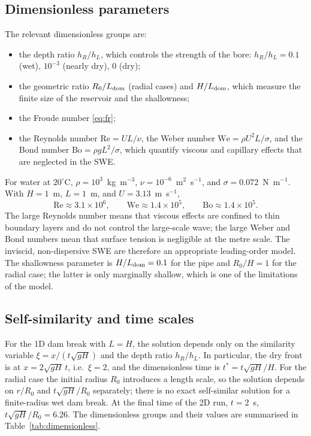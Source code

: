 ﻿\documentclass[11pt,a4paper]{article}
\newcommand{\Rey}{\mathrm{Re}}
\newcommand{\We}{\mathrm{We}}
\newcommand{\Bo}{\mathrm{Bo}}
\begin{document}
\subsection{Dimensionless parameters}
The relevant dimensionless groups are:
\begin{itemize}[leftmargin=1.4em,itemsep=1pt,topsep=2pt]
\item the depth ratio $h_R/h_L$, which controls the strength of the bore:
      $h_R/h_L=0.1$ (wet), $10^{-3}$ (nearly dry), $0$ (dry);
\item the geometric ratio $R_0/L_{\rm dom}$ (radial cases) and $H/L_{\rm dom}$,
      which measure the finite size of the reservoir and the shallowness;
\item the Froude number \eqref{eq:fr};
\item the Reynolds number $\Rey=UL/\nu$, the Weber number
      $\We=\rho U^2L/\sigma$, and the Bond number $\Bo=\rho gL^2/\sigma$,
      which quantify viscous and capillary effects that are neglected in the
      SWE.
\end{itemize}
For water at $20^\circ$C, $\rho=10^3$~kg~m$^{-3}$, $\nu=10^{-6}$~m$^2$~s$^{-1}$,
and $\sigma=0.072$~N~m$^{-1}$.  With $H=1$~m, $L=1$~m, and $U=3.13$~m~s$^{-1}$,
\begin{equation}
  \Rey\approx3.1\times10^{6},\qquad
  \We\approx1.4\times10^{5},\qquad
  \Bo\approx1.4\times10^{5}.
\end{equation}
The large Reynolds number means that viscous effects are confined to thin
boundary layers and do not control the large-scale wave; the large Weber and
Bond numbers mean that surface tension is negligible at the metre scale.  The
inviscid, non-dispersive SWE are therefore an appropriate leading-order model.
The shallowness parameter is $H/L_{\rm dom}=0.1$ for the pipe and $R_0/H=1$ for
the radial case; the latter is only marginally shallow, which is one of the
limitations of the model.

\subsection{Self-similarity and time scales}
For the 1D dam break with $L=H$, the solution depends only on the similarity
variable $\xi=x/(t\sqrt{gH})$ and the depth ratio $h_R/h_L$.  In particular,
the dry front is at $x=2\sqrt{gH}\,t$, i.e.\ $\xi=2$, and the dimensionless
time is $t^*=t\sqrt{gH}/H$.  For the radial case the initial radius $R_0$
introduces a length scale, so the solution depends on $r/R_0$ and
$t\sqrt{gH}/R_0$ separately; there is no exact self-similar solution for a
finite-radius wet dam break.  At the final time of the 2D run,
$t=2$~s, $t\sqrt{gH}/R_0=6.26$.  The dimensionless groups and their values are
summarised in Table~\ref{tab:dimensionless}.
\end{document}
